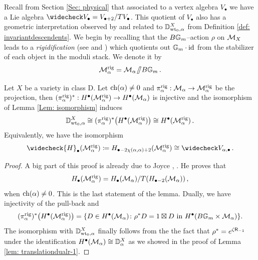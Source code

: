 \documentclass[a4paper, 12pt]{amsart}
\begin{document}
Recall from Section \ref{Sec: physical} that associated to a vertex algebra $V_\bullet$ we have a Lie algebra $\widecheck V_\bullet=V_{\bullet+2}/TV_\bullet$. This quotient of $V_{\bullet}$ also has a geometric interpretation observed by \cite{Jo17} and related to ${\mathbb{D}}^X_{{\mathrm{wt}_0}, \alpha}$ from Definition \ref{def: invariantdescendents}. We begin by recalling that the $B{\mathbb{G}}_m$--action $\rho$ on ${\mathcal M}_X$ leads to a \textit{rigidification} (see \cite[Appendix]{AOV} and \cite[Proposition 2.25 (b)]{Jo17}) which quotients out ${\mathbb{G}}_m\cdot \operatorname{id}$ from the stabilizer of each object in the moduli stack. We denote it by 
$$
{\mathcal M}_\alpha^{\mathrm{rig}}={\mathcal M}_\alpha \mkern-7mu\fatslash B{\mathbb{G}}_m\,.
$$
\begin{lemma}
\label{Lem: DXinv}
Let $X$ be a variety in class D. Let $\mathrm{ch}(\alpha)\neq 0$ and $\pi^{\mathrm{rig}}_{\alpha}: {\mathcal M}_\alpha\to {\mathcal M}^{\mathrm{rig}}_\alpha$ be the projection, then $(\pi^{\mathrm{rig}}_\alpha)^\ast: H^\bullet({\mathcal M}^{\mathrm{rig}}_\alpha)\to H^\bullet({\mathcal M}_{\alpha})$ is injective and the isomorphism of Lemma \ref{Lem: isomorphism} induces
$$
{\mathbb{D}}^X_{{\mathrm{wt}_0},\alpha}\cong(\pi^{\mathrm{rig}}_{\alpha})^\ast\big(H^\bullet({\mathcal M}^{\mathrm{rig}}_{\alpha})\big)\cong H^\bullet({\mathcal M}^{\mathrm{rig}}_{\alpha})\,.
$$
Equivalently, we have the isomorphism
$$
\widecheck{H}_{\bullet}(\CM^{\rig}_{\alpha}) \coloneqq H_{\bullet-2\chi(\alpha,\alpha)+2}(\CM^{\rig}_\alpha)\cong \widecheck V_{\alpha, \bullet}\,.
$$
\end{lemma}
\begin{proof}
A big part of this proof is already due to Joyce \cite[Proposition 3.24]{Jo17}, \cite[Theorem 4.8, Remark 4.10]{Jo21}. He proves that 
$$
H_\bullet({\mathcal M}^{\mathrm{rig}}_{\alpha}) =H_\bullet({\mathcal M}_\alpha)/T(H_{\bullet-2}({\mathcal M}_\alpha))\,,
$$
when $\mathrm{ch}(\alpha)\neq 0$. This is the last statement of the lemma. Dually, we have injectivity of the pull-back and
\[(\pi^{\mathrm{rig}}_{\alpha})^\ast\big(H^\bullet({\mathcal M}^{\mathrm{rig}}_{\alpha})\big) =\{D\in H^\bullet({\mathcal M}_{\alpha}) \colon \rho^*D = 1\boxtimes D \textup{ in }H^\bullet(B {\mathbb{G}}_m\times {\mathcal M}_\alpha) \}.\] The isomorphism with ${\mathbb{D}}^X_{{\mathrm{wt}_0},\alpha}$ finally follows from the the fact that $\rho^\ast=e^{\zeta \mathsf{R}_{-1}}$ under the identification $H^\bullet({\mathcal M}_\alpha)\cong {\mathbb{D}}^X_\alpha$ as we showed in the proof of Lemma \ref{lem: translationdualr-1}. 
\end{proof}
\end{document}
